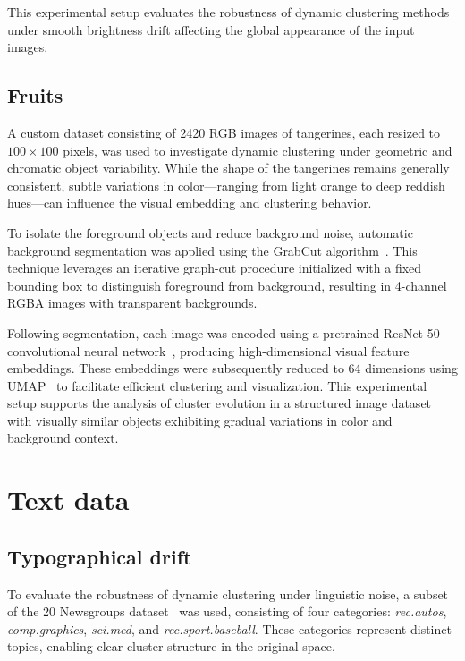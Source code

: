 This experimental setup evaluates the robustness of dynamic clustering methods
under smooth brightness drift affecting the global appearance of the input
images.

\subsection{Fruits}\label{subsec:fruits}

A custom dataset consisting of 2420 RGB images of tangerines, each resized to
$100 \times 100$ pixels, was used to investigate dynamic clustering under
geometric and chromatic object variability. While the shape of the tangerines
remains generally consistent, subtle variations in color—ranging from light
orange to deep reddish hues—can influence the visual embedding and clustering
behavior.

To isolate the foreground objects and reduce background noise, automatic
background segmentation was applied using the GrabCut algorithm~\cite{grabcut}.
This technique leverages an iterative graph-cut procedure initialized with a
fixed bounding box to distinguish foreground from background, resulting in
4-channel RGBA images with transparent backgrounds.

Following segmentation, each image was encoded using a pretrained ResNet-50
convolutional neural network~\cite{resnet}, producing high-dimensional visual
feature embeddings. These embeddings were subsequently reduced to 64 dimensions
using UMAP~\cite{umap} to facilitate efficient clustering and visualization.
This experimental setup supports the analysis of cluster evolution in a
structured image dataset with visually similar objects exhibiting gradual
variations in color and background context.

\section{Text data}\label{sec:text_data}

\subsection{Typographical drift}\label{subsec:typographical_drift}
To evaluate the robustness of dynamic clustering under linguistic noise, a
subset of the 20 Newsgroups dataset~\cite{20newsgroups} was used, consisting of
four categories: \textit{rec.autos}, \textit{comp.graphics}, \textit{sci.med},
and \textit{rec.sport.baseball}. These categories represent distinct topics,
enabling clear cluster structure in the original space.

